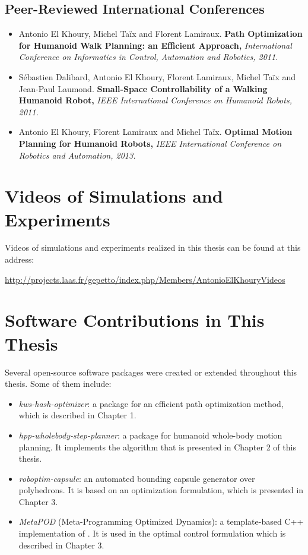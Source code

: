 \subsection*{Peer-Reviewed International Conferences}
\begin{itemize}
\item Antonio El Khoury, Michel Ta\"ix and Florent
  Lamiraux. \textbf{Path Optimization for Humanoid Walk Planning: an
    Efficient Approach,} \textit{International Conference on
    Informatics in Control, Automation and Robotics, 2011.}

\item S\'ebastien Dalibard, Antonio El Khoury, Florent Lamiraux,
  Michel Ta\"ix and Jean-Paul Laumond. \textbf{Small-Space
    Controllability of a Walking Humanoid Robot,} \textit{IEEE
    International Conference on Humanoid Robots, 2011.}

\item Antonio El Khoury, Florent Lamiraux and Michel
  Ta\"ix. \textbf{Optimal Motion Planning for Humanoid Robots,}
  \textit{IEEE International Conference on Robotics and Automation,
    2013.}
\end{itemize}

\section{Videos of Simulations and Experiments}

Videos of simulations and experiments realized in this thesis can be
found at this address:

\url{http://projects.laas.fr/gepetto/index.php/Members/AntonioElKhouryVideos}

\section{Software Contributions in This Thesis}

Several open-source software packages were created or extended
throughout this thesis. Some of them include:

\begin{itemize}
  \item \textit{kws-hash-optimizer}: a package for an efficient path
    optimization method, which is described in Chapter 1.
  \item \textit{hpp-wholebody-step-planner}: a package for humanoid whole-body
    motion planning. It implements the algorithm that is presented in
    Chapter 2 of this thesis.
  \item \textit{roboptim-capsule}: an automated bounding capsule generator over
    polyhedrons. It is based on an optimization formulation, which is
    presented in Chapter 3.
  \item \textit{MetaPOD} (Meta-Programming Optimized Dynamics): a
    template-based C++ implementation of \cite{feat08}. It is used in
    the optimal control formulation which is described in Chapter 3.
\end{itemize}
